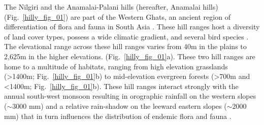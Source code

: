 The Nilgiri and the Anamalai-Palani hills (hereafter, Anamalai hills) (Fig.~\ref{hilly_fig_01}) are part of the Western Ghats, an ancient region of differentiation of flora and fauna in South Asia \citep{mani1974,myers2000,vijayakumar2016}.
These hill ranges host a diversity of land cover types, possess a wide climatic gradient, and several bird species \citep{ali1983,das2006}.
The elevational range across these hill ranges varies from 40m in the plains to 2,625m in the higher elevations.
(Fig.~\ref{hilly_fig_01}a).
These two hill ranges are home to a multitude of habitats, ranging from high elevation grasslands (>1400m; Fig.~\ref{hilly_fig_01}b) to mid-elevation evergreen forests (>700m and <1400m; Fig.~\ref{hilly_fig_01}b).
These hill ranges interact strongly with the annual south-west monsoon resulting in orographic rainfall on the western slopes ($\sim$3000 mm) and a relative rain-shadow on the leeward eastern slopes ($\sim$2000 mm) that in turn influences the distribution of endemic flora and fauna \citep{gadgil1986,pascal1988,robin2015}.

